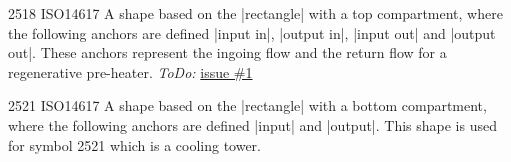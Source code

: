 \documentclass[a4paper]{ltxdoc}
\begin{document}
\begin{shape}{2518 ISO14617}
	A shape based on the |rectangle| with a top compartment, where the following anchors are defined |input in|, |output in|, |input out| and |output out|. These anchors represent the ingoing flow and the return flow for a regenerative pre-heater.
	\emph{ToDo:} \href{https://github.com/peer23peer/PIDcircuitTikZ/issues/1}{issue \#1}
	\begin{codeexample}[]
	\end{codeexample}
\end{shape}

\begin{shape}{2521 ISO14617}
	A shape based on the |rectangle| with a bottom compartment, where the following anchors are defined |input| and |output|. This shape is used for symbol 2521 which is a cooling tower.
	\begin{codeexample}[]
	\end{codeexample}
\end{shape}
\end{document}
